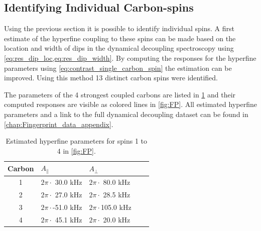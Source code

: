 \subsection{Identifying Individual Carbon-spins}
Using the previous section it is possible to identify individual spins.
A first estimate of the hyperfine coupling to these spins can be made based on the location and width of dips in the dynamical decoupling spectroscopy using \cref{eq:res_dip_loc,eq:res_dip_width}.
By computing the responses for the hyperfine parameters using \cref{eq:contrast_single_carbon_spin} the estimation can be improved.
Using this method 13 distinct carbon spins were identified.

The parameters of the 4 strongest coupled carbons are listed in \cref{tbl:HF_par} and their computed responses are visible as colored lines in \cref{fig:FP}.
All estimated hyperfine parameters and a link to the full dynamical decoupling dataset can be found in \cref{chap:Fingerprint_data_appendix}.

\begin{table}[htbp]
\centering
    \caption{Estimated hyperfine parameters for spins 1 to 4 in \cref{fig:FP}.}
    \begin{tabular}{cllll}
    Carbon & \quad \quad  $A_{\parallel} $ & \quad \quad $A_{\perp}$ \\ \hline
    1         & $2 \pi \cdot${ }30.0 kHz             & $2 \pi \cdot${ }80.0 kHz                \\
    2         & $2 \pi \cdot${ }27.0 kHz             & $2 \pi \cdot${ }28.5 kHz              \\
    3         & $2 \pi \cdot$-51.0 kHz          & $2 \pi \cdot$105.0 kHz              \\
    4         & $2 \pi \cdot${ }45.1 kHz           & $2 \pi \cdot${ }20.0 kHz                \\
    \end{tabular}
    \label{tbl:HF_par}
\end{table}

